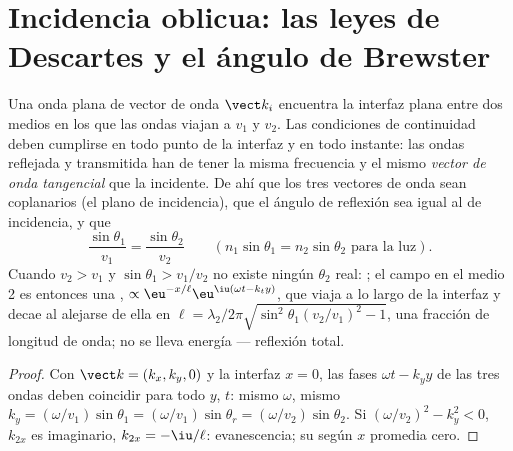 \section{Incidencia oblicua: las leyes de Descartes y el ángulo de Brewster}

\begin{theorem}\label{thm:b2:wave-interfaces:snell}
Una onda plana de vector de onda $\vect k_i$ encuentra la interfaz plana entre
dos medios en los que las ondas viajan a $v_1$ y $v_2$. Las condiciones de
continuidad deben cumplirse en todo punto de la interfaz y en todo instante:
las ondas reflejada y transmitida han de tener la misma frecuencia y
el mismo \emph{vector de onda tangencial} que la incidente. De ahí que los
tres vectores de onda sean coplanarios (el plano de incidencia), que el ángulo de
reflexión sea igual al de incidencia, y que
\[
\frac{\sin\theta_1}{v_1} = \frac{\sin\theta_2}{v_2} \qquad (n_1\sin\theta_1 = n_2\sin\theta_2 \text{ para la luz}) .
\]
Cuando $v_2 > v_1$ y $\sin\theta_1 > v_1/v_2$ no existe ningún $\theta_2$ real:
\emph{}; el campo en el medio 2 es entonces una
\emph{}, $\propto\eu^{-x/\ell}\eu^{\iu(\omega t - k_ty)}$, que viaja
a lo largo de la interfaz y decae al alejarse de ella en $\ell = \lambda_2/2\pi
\sqrt{\sin^2\theta_1(v_2/v_1)^2 - 1}$, una fracción de longitud de onda; no
se lleva energía --- reflexión total.
\end{theorem}

\begin{proof}
Con $\vect k = (k_x, k_y, 0)$ y la interfaz $x = 0$, las fases
$\omega t - k_yy$ de las tres ondas deben coincidir para todo $y$, $t$: mismo
$\omega$, mismo $k_y = (\omega/v_1)\sin\theta_1 = (\omega/v_1)\sin\theta_r = (\omega/v_2)\sin
\theta_2$. Si $(\omega/v_2)^2 - k_y^2 < 0$, $k_{2x}$ es imaginario, $k_{2x} = -\iu/\ell$:
evanescencia; su  según $x$ promedia cero.
\end{proof}

